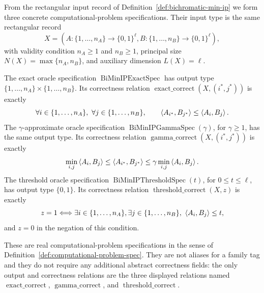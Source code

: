 \begin{definition}
  \label{def:rectangular-bichromatic-minip-oracle-specs}
  From the rectangular input record of Definition~\ref{def:bichromatic-min-ip}
  we form three concrete computational-problem specifications.  Their input
  type is the same rectangular record
  \[
    X=(A:\{1,\ldots,n_A\}\to\{0,1\}^{\ell},
       B:\{1,\ldots,n_B\}\to\{0,1\}^{\ell}),
  \]
  with validity condition $n_A\geq1$ and $n_B\geq1$, principal size
  $N(X)=\max\{n_A,n_B\}$, and auxiliary dimension $L(X)=\ell$.

  The exact oracle specification
  $\operatorname{BiMinIPExactSpec}$ has output type
  $\{1,\ldots,n_A\}\times\{1,\ldots,n_B\}$.  Its correctness relation
  $\operatorname{exact\_correct}(X,(i^*,j^*))$ is exactly
  \[
    \forall i\in\{1,\ldots,n_A\},\ \forall j\in\{1,\ldots,n_B\},\qquad
    \ip{A_{i^*}}{B_{j^*}}\leq\ip{A_i}{B_j}.
  \]
  The $\gamma$-approximate oracle specification
  $\operatorname{BiMinIPGammaSpec}(\gamma)$, for $\gamma\geq1$, has the same
  output type.  Its correctness relation
  $\operatorname{gamma\_correct}(X,(i^*,j^*))$ is exactly
  \[
    \min_{i,j}\left\langle A_i,B_j\right\rangle
      \leq \left\langle A_{i^*},B_{j^*}\right\rangle
      \leq \gamma\min_{i,j}\left\langle A_i,B_j\right\rangle.
  \]
  The threshold oracle specification
  $\operatorname{BiMinIPThresholdSpec}(t)$, for $0\leq t\leq\ell$, has output
  type $\{0,1\}$.  Its correctness relation
  $\operatorname{threshold\_correct}(X,z)$ is exactly
  \[
    z=1\Longleftrightarrow
    \exists i\in\{1,\ldots,n_A\},\exists j\in\{1,\ldots,n_B\},\
      \left\langle A_i,B_j\right\rangle\leq t,
  \]
  and $z=0$ in the negation of this condition.

  These are real computational-problem specifications in the sense of
  Definition~\ref{def:computational-problem-spec}.  They are not aliases for a
  family tag and they do not require any additional abstract correctness
  fields: the only output and correctness relations are the three displayed
  relations named $\operatorname{exact\_correct}$,
  $\operatorname{gamma\_correct}$, and
  $\operatorname{threshold\_correct}$.
\end{definition}

